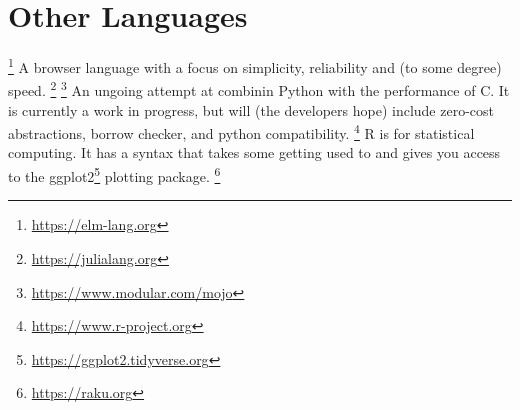 \section{Other Languages}

\begin{itemize}
  \footnote{\url{https://elm-lang.org}} A  browser language with a focus on simplicity, reliability and (to some degree) speed.
  \footnote{\url{https://julialang.org}}
  \footnote{\url{https://www.modular.com/mojo}} An ungoing attempt at combinin Python with the performance of C. It is currently a work in progress, but will (the developers hope) include zero-cost abstractions, borrow checker, and python compatibility.
  \footnote{\url{https://www.r-project.org}} R is for statistical computing. It has a syntax that takes some getting used to and gives you access to the ggplot2\footnote{\url{https://ggplot2.tidyverse.org}} plotting package.
  \footnote{\url{https://raku.org}}
\end{itemize}
